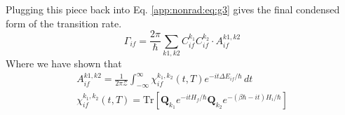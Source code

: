 Plugging this piece back into Eq. \ref{app:nonrad:eq:g3} gives the final condensed form of the transition rate.
\begin{equation}
    \Gamma_{if}=\frac{2\pi}{\hbar} \sum_{k1,k2} C^{k_1}_{if}C^{k_2}_{if}\cdot A^{k1,k2}_{if}
\end{equation}
Where we have shown that
\begin{align}
    A^{k1,k2}_{if}=\frac{1}{2\pi \mathcal{Z}}\int_{-\infty}^{\infty}\chi^{k_1,k_2}_{if}(t,T)e^{-it\Delta E_{if}/\hbar}\,dt \\
    \chi^{k_1,k_2}_{if}(t,T) = \text{Tr}\left[ \mathbf{Q}_{k_1} e^{-it H_{f}/\hbar}
    \mathbf{Q}_{k_2}e^{-(\beta\hbar-it)H_{i}/\hbar} \right]
\end{align}
